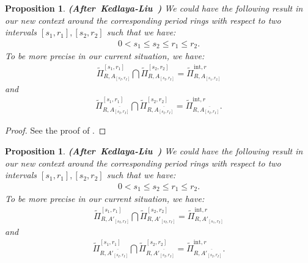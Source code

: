 \documentclass[12pt]{amsart}
\newtheorem{proposition}[theorem]{Proposition}
\theoremstyle{definition}
\numberwithin{equation}{section}
\begin{document}
\begin{proposition} \mbox{\bf{(After Kedlaya-Liu \cite[Lemma 5.2.10]{KL1})}}
We could have the following result in our new context around the corresponding period rings with respect to two intervals $[s_1,r_1],[s_2,r_2]$ such that we have:
\begin{align}
0<s_1\leq s_2\leq r_1 \leq r_2.	
\end{align}
To be more precise in our current situation, we have:
\begin{align}
\widetilde{\Pi}^{[s_1,r_1]}_{R,A_{[s_I,r_I]}}\bigcap \widetilde{\Pi}^{[s_2,r_2]}_{R,A_{[s_I,r_I]}}=	\widetilde{\Pi}^{\mathrm{int},r}_{R,A_{[s_1,r_2]}}	
\end{align}
and 
\begin{align}
\widetilde{\Pi}^{[s_1,r_1]}_{R,\overline{A_{[s_I,r_I]}}}\bigcap \widetilde{\Pi}^{[s_2,r_2]}_{R,\overline{A_{[s_I,r_I]}}}=	\widetilde{\Pi}^{\mathrm{int},r}_{R,\overline{A_{[s_I,r_I]}}}.	
\end{align}

\end{proposition}


\begin{proof}
See the proof of \cite[Lemma 5.2.10]{KL1}.	
\end{proof}





\begin{proposition} \mbox{\bf{(After Kedlaya-Liu \cite[Lemma 5.2.10]{KL1})}}
We could have the following result in our new context around the corresponding period rings with respect to two intervals $[s_1,r_1],[s_2,r_2]$ such that we have:
\begin{align}
0<s_1\leq s_2\leq r_1 \leq r_2.	
\end{align}
To be more precise in our current situation, we have:
\begin{align}
\widetilde{\Pi}^{[s_1,r_1]}_{R,A'_{[s_I,r_I]}}\bigcap \widetilde{\Pi}^{[s_2,r_2]}_{R,A'_{[s_I,r_I]}}=	\widetilde{\Pi}^{\mathrm{int},r}_{R,A'_{[s_1,r_2]}}	
\end{align}
and 
\begin{align}
\widetilde{\Pi}^{[s_1,r_1]}_{R,\overline{A'_{[s_I,r_I]}}}\bigcap \widetilde{\Pi}^{[s_2,r_2]}_{R,\overline{A'_{[s_I,r_I]}}}=	\widetilde{\Pi}^{\mathrm{int},r}_{R,\overline{A'_{[s_I,r_I]}}}.	
\end{align}

\end{proposition}
\end{document}
